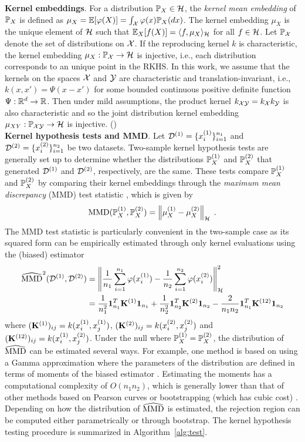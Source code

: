 \textbf{Kernel embeddings}. For a distribution $\P_X\in\calH$, the \textit{kernel mean embedding} of $\P_X$ is defined as $\mu_X=\E[\varphi(X)]=\int_\calX\varphi(x)\P_X(dx)$. The kernel embedding $\mu_X$ is the unique element of $\calH$ such that $\E_X[f(X)]=\langle f,\mu_X\rangle_\calH$ for all $f\in\calH$. Let $\P_\calX$ denote the set of distributions on $\calX$. If the reproducing kernel $k$ is characteristic, the kernel embedding $\mu_X:\P_\calX\rightarrow\calH$ is injective, i.e., each distribution corresponds to an unique point in the RKHS. In this work, we assume that the kernels on the spaces $\calX$ and $\calY$ are characteristic and translation-invariant, i.e., $k(x,x') = \Psi(x-x')$ for some bounded continuous positive definite function $\Psi:\bbR^d\rightarrow\bbR$. Then under mild assumptions, the product kernel $k_{\calX\calY}=k_\calX k_\calY$ is also characteristic \parencite[Corollary 11]{Sriperumbudur:2010} and so the joint distribution kernel embedding $\mu_{XY}:\P_{\calX\calY}\rightarrow\calH$ is injective. (\todo)
\\

\textbf{Kernel hypothesis tests and MMD}. Let $\calD^{(1)}=\{\xo_i\}_{i=1}^{n_1}$ and $\calD^{(2)}=\{\xt_i\}_{i=1}^{n_2}$ be two datasets. Two-sample kernel hypothesis tests are generally set up to determine whether the distributions $\P_X^{(1)}$ and $\P_X^{(2)}$ that generated $\calD^{(1)}$ and $\calD^{(2)}$, respectively, are the same. These tests compare $\P_X^{(1)}$ and $\P_X^{(2)}$ by comparing their kernel embeddings through the \textit{maximum mean discrepancy} (MMD) test statistic \parencite{Gretton:2012}, which is given by
\[
\MMD(\P_X^{(1)},\P_X^{(2)}) = \left\|\mu_X^{(1)}-\mu_X^{(2)}\right\|_\calH \;.
\]
The MMD test statistic is particularly convenient in the two-sample case as its squared form can be empirically estimated through only kernel evaluations using the (biased) estimator
\begin{align*}
\hatMMD^2(\calD^{(1)},\calD^{(2)}) &= \left\|\frac{1}{n_1}\sum_{i=1}^{n_1}\varphi(\xo_i)-\frac{1}{n_2}\sum_{i=1}^{n_2}\varphi(\xt_i)\right\|_\calH^2 \\
&= \frac{1}{n_1^2}\onevec_{n_1}^T\bfK^{(1)}\onevec_{n_1} + \frac{1}{n_2^2}\onevec_{n_2}^T\bfK^{(2)}\onevec_{n_2} - \frac{2}{n_1n_2}\onevec_{n_1}^T\bfK^{(12)}\onevec_{n_2}
\end{align*}
where $(\bfK^{(1)})_{ij}=k(\xo_i,\xo_j)$, $(\bfK^{(2)})_{ij}=k(\xt_i,\xt_j)$ and $(\bfK^{(12)})_{ij}=k(\xo_i,\xt_j)$. Under the null where $\P_X^{(1)}=\P_X^{(2)}$, the distribution of $\hatMMD$ can be estimated several ways. For example, one method is based on using a Gamma approximation where the parameters of the distribution are defined in terms of moments of the biased estimator \parencite{Gretton:2009}. Estimating the moments has a computational complexity of $O(n_1n_2)$, which is generally lower than that of other methods based on Pearson curves or bootstrapping (which has cubic cost) \parencite{Gretton:2009}. Depending on how the distribution of $\hatMMD$ is estimated, the rejection region can be computed either parametrically or through bootstrap. The kernel hypothesis testing procedure is summarized in Algorithm~\ref{alg:test}.

